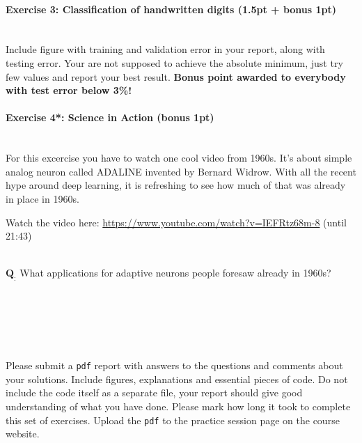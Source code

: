 \documentclass[a4paper,11pt]{article}
\newenvironment{exercise}[3]{\paragraph{Exercise #1: #2 (#3pt)}\ \\}{
\medskip}
\newcommand{\question}[2]{\setlength\parindent{0mm}\ \\$\mathbf{Q_#1:}$ #2\ \\}
\begin{document}
\begin{exercise}{3}{Classification of handwritten digits}{1.5pt + bonus 1}
Include figure with training and validation error in your report, along with testing error. Your are not supposed to achieve the absolute minimum, just try few values and report your best result. \textbf{Bonus point awarded to everybody with test error below 3\%!}

\end{exercise}



%
%
\begin{exercise}{4*}{Science in Action}{bonus 1}

For this excercise you have to watch one cool video from 1960s. It's about simple analog neuron called ADALINE invented by Bernard Widrow. With all the recent hype around deep learning, it is refreshing to see how much of that was already in place in 1960s.

Watch the video here: \url{https://www.youtube.com/watch?v=IEFRtz68m-8} (until 21:43)

\question{}{What applications for adaptive neurons people foresaw already in 1960s?}

\end{exercise}


\ \\
\ \\
\ \\
\ \\
\ \\
Please submit a \texttt{pdf} report with answers to the questions and comments about your solutions. Include figures, explanations and essential pieces of code. Do not include the code itself as a separate file, your report should give good understanding of what you have done. Please mark how long it took to complete this set of exercises. Upload the \texttt{pdf} to the practice session page on the course website.
\end{document}
